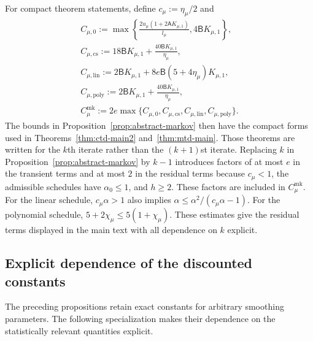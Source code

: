 \documentclass{article}
\begin{document}
For compact theorem statements, define $c_\mu:=\eta_\mu/2$ and
\begin{equation}
\begin{gathered}
C_{\mu,0}:=\max\left\{\frac{2u_\mu(1+2\mathsf A K_{\mu,1})}{l_\mu},4\mathsf B K_{\mu,1}\right\}, \\
C_{\mu,\mathrm{cs}}:=18\mathsf B K_{\mu,1}+\frac{40\mathsf B K_{\mu,1}}{\eta_\mu}, \\
C_{\mu,\mathrm{lin}}:=2\mathsf B K_{\mu,1}+8e\mathsf B(5+4\eta_\mu)K_{\mu,1}, \\
C_{\mu,\mathrm{poly}}:=2\mathsf B K_{\mu,1}+\frac{40\mathsf B K_{\mu,1}}{\eta_\mu}, \\
C_\mu^{\mathrm{mk}}:=2e\max\{C_{\mu,0},C_{\mu,\mathrm{cs}},C_{\mu,\mathrm{lin}},C_{\mu,\mathrm{poly}}\}.
\end{gathered}
\end{equation}
The bounds in Proposition~\ref{prop:abstract-markov} then have the compact forms used in Theorems~\ref{thm:ctd-main2} and~\ref{thm:mtd-main}. Those theorems are written for the $k$th iterate rather than the $(k+1)$st iterate. Replacing $k$ in Proposition~\ref{prop:abstract-markov} by $k-1$ introduces factors of at most $e$ in the transient terms and at most $2$ in the residual terms because $c_\mu<1$, the admissible schedules have $\alpha_0\le1$, and $h\ge2$. These factors are included in $C_\mu^{\mathrm{mk}}$. For the linear schedule, $c_\mu\alpha>1$ also implies $\alpha\le\alpha^2/(c_\mu\alpha-1)$. For the polynomial schedule, $5+2\chi_\mu\le5(1+\chi_\mu)$. These estimates give the residual terms displayed in the main text with all dependence on $k$ explicit.


\subsection{Explicit dependence of the discounted constants}

The preceding propositions retain exact constants for arbitrary smoothing parameters. The following specialization makes their dependence on the statistically relevant quantities explicit.
\end{document}

